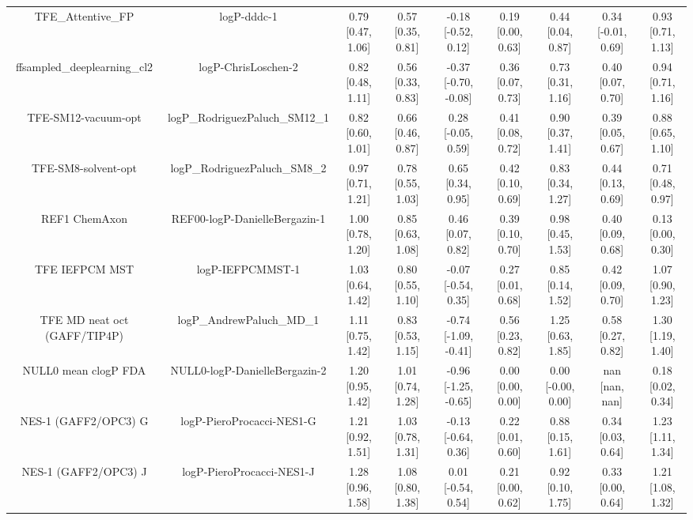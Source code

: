 \documentclass{article}
\begin{document}
\begin{center}
\begin{longtable}{|ccccccccc|}
            TFE_Attentive_FP &                                   logP-dddc-1 & 0.79 [0.47, 1.06] & 0.57 [0.35, 0.81] &  -0.18 [-0.52, 0.12] & 0.19 [0.00, 0.63] &    0.44 [0.04, 0.87] &   0.34 [-0.01, 0.69] &    0.93 [0.71, 1.13] \\
  ffsampled_deeplearning_cl2 &                           logP-ChrisLoschen-2 & 0.82 [0.48, 1.11] & 0.56 [0.33, 0.83] & -0.37 [-0.70, -0.08] & 0.36 [0.07, 0.73] &    0.73 [0.31, 1.16] &    0.40 [0.07, 0.70] &    0.94 [0.71, 1.16] \\
         TFE-SM12-vacuum-opt &                logP\_RodriguezPaluch\_SM12\_1 & 0.82 [0.60, 1.01] & 0.66 [0.46, 0.87] &   0.28 [-0.05, 0.59] & 0.41 [0.08, 0.72] &    0.90 [0.37, 1.41] &    0.39 [0.05, 0.67] &    0.88 [0.65, 1.10] \\
         TFE-SM8-solvent-opt &                 logP\_RodriguezPaluch\_SM8\_2 & 0.97 [0.71, 1.21] & 0.78 [0.55, 1.03] &    0.65 [0.34, 0.95] & 0.42 [0.10, 0.69] &    0.83 [0.34, 1.27] &    0.44 [0.13, 0.69] &    0.71 [0.48, 0.97] \\
               REF1 ChemAxon &                 REF00-logP-DanielleBergazin-1 & 1.00 [0.78, 1.20] & 0.85 [0.63, 1.08] &    0.46 [0.07, 0.82] & 0.39 [0.10, 0.70] &    0.98 [0.45, 1.53] &    0.40 [0.09, 0.68] &    0.13 [0.00, 0.30] \\
              TFE IEFPCM MST &                              logP-IEFPCMMST-1 & 1.03 [0.64, 1.42] & 0.80 [0.55, 1.10] &  -0.07 [-0.54, 0.35] & 0.27 [0.01, 0.68] &    0.85 [0.14, 1.52] &    0.42 [0.09, 0.70] &    1.07 [0.90, 1.23] \\
TFE MD neat oct (GAFF/TIP4P) &                     logP\_AndrewPaluch\_MD\_1 & 1.11 [0.75, 1.42] & 0.83 [0.53, 1.15] & -0.74 [-1.09, -0.41] & 0.56 [0.23, 0.82] &    1.25 [0.63, 1.85] &    0.58 [0.27, 0.82] &    1.30 [1.19, 1.40] \\
        NULL0 mean clogP FDA &                 NULL0-logP-DanielleBergazin-2 & 1.20 [0.95, 1.42] & 1.01 [0.74, 1.28] & -0.96 [-1.25, -0.65] & 0.00 [0.00, 0.00] &   0.00 [-0.00, 0.00] &       nan [nan, nan] &    0.18 [0.02, 0.34] \\
        NES-1 (GAFF2/OPC3) G &                     logP-PieroProcacci-NES1-G & 1.21 [0.92, 1.51] & 1.03 [0.78, 1.31] &  -0.13 [-0.64, 0.36] & 0.22 [0.01, 0.60] &    0.88 [0.15, 1.61] &    0.34 [0.03, 0.64] &    1.23 [1.11, 1.34] \\
        NES-1 (GAFF2/OPC3) J &                     logP-PieroProcacci-NES1-J & 1.28 [0.96, 1.58] & 1.08 [0.80, 1.38] &   0.01 [-0.54, 0.54] & 0.21 [0.00, 0.62] &    0.92 [0.10, 1.75] &    0.33 [0.00, 0.64] &    1.21 [1.08, 1.32] \\

\end{longtable}
\end{center}
\end{document}
